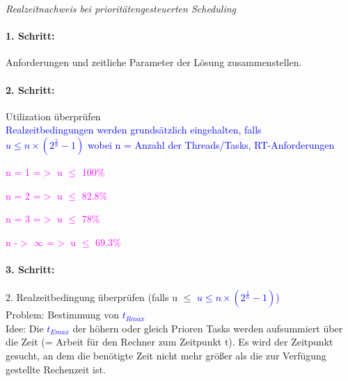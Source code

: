 \documentclass[12pt,a4paper,oneside,ngerman]{article}
\begin{document}



\emph{Realzeitnachweis bei prioritätengesteuerten Scheduling}\\
\paragraph{1. Schritt:}
Anforderungen und zeitliche Parameter der Lösung zusammenstellen.
\paragraph{2. Schritt:}
Utilization überprüfen\\
\textcolor{blue}{Realzeitbedingungen werden grundsätzlich eingehalten, falls}\\

\textcolor{blue}{\(u \leq n\times( 2^\frac{1}{n} - 1)\) wobei n = Anzahl der Threads/Tasks, RT-Anforderungen}
\begin{description}
	\item \textcolor{magenta}{n = 1 =$>$ u \(\leq\) 100\%}
	\item \textcolor{magenta}{n = 2 =$>$ u \(\leq\) 82.8\%}
	\item \textcolor{magenta}{n = 3 =$>$ u \(\leq\) 78\%}
	\item \textcolor{magenta}{n -$>$ $\infty$ =$>$ u \(\leq\) 69.3\%}
\end{description}

\paragraph{3. Schritt:}
2. Realzeitbedingung überprüfen (falls u $\leq$ \textcolor{blue}{\(u \leq n\times( 2^\frac{1}{n} - 1)\))}\\
Problem: Bestimmung von \textcolor{blue}{\(t_{Rmax}\)} \\
Idee: Die \textcolor{blue}{\(t_{Emax}\)} der höhern oder gleich Prioren Tasks werden aufsummiert über die Zeit (= Arbeit für den Rechner zum Zeitpunkt t).
Es wird der Zeitpunkt gesucht, an dem die benötigte Zeit nicht mehr größer als die zur Verfügung gestellte Rechenzeit ist.\\
\end{document}

